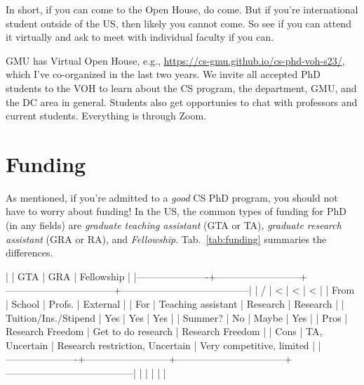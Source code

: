 \documentclass[10pt]{article}
\begin{document}
In short, if you can come to the Open House, do come.  But if you're international student outside of the US, then likely you cannot come.  So see if you can attend it virtually and ask to meet with individual faculty if you can.

\begin{tcolorbox}[left=1pt,right=1pt,top=1pt,bottom=1pt]
GMU has Virtual Open House, e.g., \url{https://cs-gmu.github.io/cs-phd-voh-s23/}, which I've co-organized in the last two years. We invite all accepted PhD students to the VOH to learn about the CS program, the department, GMU, and the DC area in general. Students also get opportunies to chat with professors and current students.  Everything is through Zoom.
\end{tcolorbox}



\section{Funding}

As mentioned, if you're admitted to a \emph{good} CS PhD program, you should not have to worry about funding!  
In the US, the common types of funding for PhD (in any fields) are \emph{graduate teaching assistant} (GTA or TA), \emph{graduate research assistant} (GRA or RA), and \emph{Fellowship}. Tab.~\ref{tab:funding} summaries the differences.

|                      | GTA                      | GRA                             | Fellowship                            |
|----------------------+--------------------------+---------------------------------+---------------------------------------|
| /                    | <                        | <                               | <                                     |
| From                 | School                   | Profs.                          | External                              |
| For                  | Teaching assistant       | Research                        | Research                              |
| Tuition/Ins./Stipend | Yes                      | Yes                             | Yes                                   |
| Summer?              | No                       | Maybe                           | Yes                                   |
| Pros                 | Research Freedom         | Get to do research              | Research Freedom                      |
| Cons                 | TA, Uncertain            | Research restriction, Uncertain | Very competitive, limited             |
|----------------------+--------------------------+---------------------------------+---------------------------------------|
|                      |                          |                                 |                                       |
\end{document}
